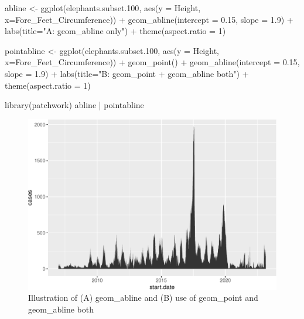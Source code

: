 \documentclass[
]{book}
\newenvironment{Shaded}{\begin{snugshade}}{\end{snugshade}}
\newcommand{\AttributeTok}[1]{\textcolor[rgb]{0.77,0.63,0.00}{#1}}
\newcommand{\DecValTok}[1]{\textcolor[rgb]{0.00,0.00,0.81}{#1}}
\newcommand{\FloatTok}[1]{\textcolor[rgb]{0.00,0.00,0.81}{#1}}
\newcommand{\FunctionTok}[1]{\textcolor[rgb]{0.00,0.00,0.00}{#1}}
\newcommand{\NormalTok}[1]{#1}
\newcommand{\OtherTok}[1]{\textcolor[rgb]{0.56,0.35,0.01}{#1}}
\newcommand{\SpecialCharTok}[1]{\textcolor[rgb]{0.00,0.00,0.00}{#1}}
\newcommand{\StringTok}[1]{\textcolor[rgb]{0.31,0.60,0.02}{#1}}
\begin{document}
\begin{Shaded}
\begin{Highlighting}[]
\NormalTok{abline }\OtherTok{\textless{}{-}} \FunctionTok{ggplot}\NormalTok{(elephants.subset}\FloatTok{.100}\NormalTok{, }\FunctionTok{aes}\NormalTok{(}\AttributeTok{y =}\NormalTok{ Height, }\AttributeTok{x=}\NormalTok{Fore\_Feet\_Circumference)) }\SpecialCharTok{+} \FunctionTok{geom\_abline}\NormalTok{(}\AttributeTok{intercept =} \FloatTok{0.15}\NormalTok{, }\AttributeTok{slope =} \FloatTok{1.9}\NormalTok{) }\SpecialCharTok{+} 
  \FunctionTok{labs}\NormalTok{(}\AttributeTok{title=}\StringTok{"A: \textasciigrave{}geom\_abline\textasciigrave{} only"}\NormalTok{) }\SpecialCharTok{+}
  \FunctionTok{theme}\NormalTok{(}\AttributeTok{aspect.ratio =} \DecValTok{1}\NormalTok{)}

\NormalTok{pointabline }\OtherTok{\textless{}{-}} \FunctionTok{ggplot}\NormalTok{(elephants.subset}\FloatTok{.100}\NormalTok{, }\FunctionTok{aes}\NormalTok{(}\AttributeTok{y =}\NormalTok{ Height, }\AttributeTok{x=}\NormalTok{Fore\_Feet\_Circumference)) }\SpecialCharTok{+} 
  \FunctionTok{geom\_point}\NormalTok{() }\SpecialCharTok{+} 
  \FunctionTok{geom\_abline}\NormalTok{(}\AttributeTok{intercept =} \FloatTok{0.15}\NormalTok{, }\AttributeTok{slope =} \FloatTok{1.9}\NormalTok{) }\SpecialCharTok{+} 
  \FunctionTok{labs}\NormalTok{(}\AttributeTok{title=}\StringTok{"B: \textasciigrave{}geom\_point + geom\_abline\textasciigrave{} both"}\NormalTok{) }\SpecialCharTok{+}
  \FunctionTok{theme}\NormalTok{(}\AttributeTok{aspect.ratio =} \DecValTok{1}\NormalTok{)}

\FunctionTok{library}\NormalTok{(patchwork)}
\NormalTok{abline }\SpecialCharTok{|}\NormalTok{ pointabline}
\end{Highlighting}
\end{Shaded}

\begin{figure}
\centering
\includegraphics{Data-Visualisation-geom-Encyclopedia_files/figure-latex/unnamed-chunk-17-1.pdf}
\caption{\label{fig:unnamed-chunk-17}Illustration of (A) geom\_abline and (B) use of geom\_point and geom\_abline both}
\end{figure}
\end{document}

